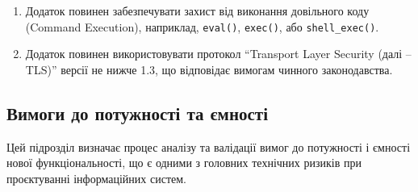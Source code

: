 \documentclass{article}
\begin{document}
\begin{enumerate}
  \item Додаток повинен забезпечувати захист від виконання довільного коду (Command Execution), наприклад, \texttt{eval()}, \texttt{exec()}, або \texttt{shell\_exec()}.

  \item Додаток повинен використовувати протокол ``Transport Layer Security (далі – TLS)'' версії не нижче 1.3, що відповідає вимогам чинного законодавства.
\end{enumerate}


\newpage
\subsection{Вимоги до потужності та ємності}

Цей підрозділ визначає процес аналізу та валідації вимог до потужності і ємності нової функціональності,
що є одними з головних технічних ризиків при проєктуванні інформаційних систем.
\end{document}
